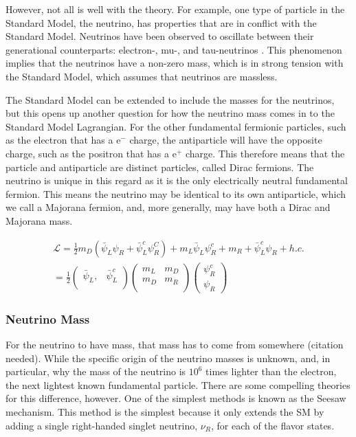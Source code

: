 \documentclass[12pt,a4paper]{article}
\begin{document}
However, not all is well with the theory. For example, one type of particle in the Standard Model, the neutrino, has properties that are in conflict with the Standard Model. Neutrinos have been observed to oscillate between their generational counterparts: electron-, mu-, and tau-neutrinos \cite{Homestake Neutrino}\cite{Super-K}\cite{Sudbury Neutrino}. This phenomenon implies that the neutrinos have a non-zero mass, which is in strong tension with the Standard Model, which assumes that neutrinos are massless.

The Standard Model can be extended to include the masses for the neutrinos, but this opens up another question for how the neutrino mass comes in to the Standard Model Lagrangian. For the other fundamental fermionic particles, such as the electron that has a $\textrm{e}^-$ charge, the antiparticle will have the opposite charge, such as the positron that has a $\textrm{e}^+$ charge. This therefore means that the particle and antiparticle are distinct particles, called Dirac fermions. The neutrino is unique in this regard as it is the only electrically neutral fundamental fermion. This means the neutrino may be identical to its own antiparticle, which we call a Majorana fermion, and, more generally, may have both a Dirac and Majorana mass.

\begin{center}
\begin{eqnarray}
\mathcal{L} = \frac{1}{2}m_D(\bar{\psi}_L\psi_R+\bar{\psi}^c_L\psi^C_R)+m_L\bar{\psi}_L\psi^c_R+m_R+\bar{\psi}^c_L\psi_R +h.c. \\
=\frac{1}{2} \begin{pmatrix}
\bar{\psi}_L,& \bar{\psi}^c_L \\
\end{pmatrix} \begin{pmatrix}
m_L & m_D \\
m_D & m_R \\
\end{pmatrix}
\begin{pmatrix}
\psi^c_R \\
\psi_R
\end{pmatrix}
\end{eqnarray}
\end{center}

\subsubsection{Neutrino Mass}

For the neutrino to have mass, that mass has to come from somewhere (\color{blue}citation needed\color{black}). While the specific origin of the neutrino masses is unknown, and, in particular, why the mass of the neutrino is $10^6$ times lighter than the electron, the next lightest known fundamental particle. There are some compelling theories for this difference, however. One of the simplest methods is known as the Seesaw mechanism. This method is the simplest because it only extends the SM by adding a single right-handed singlet neutrino, $\nu_R$, for each of the flavor states.
\end{document}
